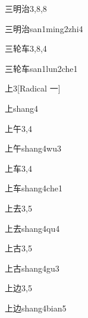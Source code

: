 \begin{entry}{三明治}{3,8,8}
  \begin{phonetics}{三明治}{san1ming2zhi4}
  \end{phonetics}
\end{entry}

\begin{entry}{三轮车}{3,8,4}
  \begin{phonetics}{三轮车}{san1lun2che1}
  \end{phonetics}
\end{entry}

\begin{entry}{上}{3}[Radical 一]
  \begin{phonetics}{上}{shang4}
  \end{phonetics}
\end{entry}

\begin{entry}{上午}{3,4}
  \begin{phonetics}{上午}{shang4wu3}
  \end{phonetics}
\end{entry}

\begin{entry}{上车}{3,4}
  \begin{phonetics}{上车}{shang4che1}
  \end{phonetics}
\end{entry}

\begin{entry}{上去}{3,5}
  \begin{phonetics}{上去}{shang4qu4}
  \end{phonetics}
\end{entry}

\begin{entry}{上古}{3,5}
  \begin{phonetics}{上古}{shang4gu3}
  \end{phonetics}
\end{entry}

\begin{entry}{上边}{3,5}
  \begin{phonetics}{上边}{shang4bian5}
  \end{phonetics}
\end{entry}

